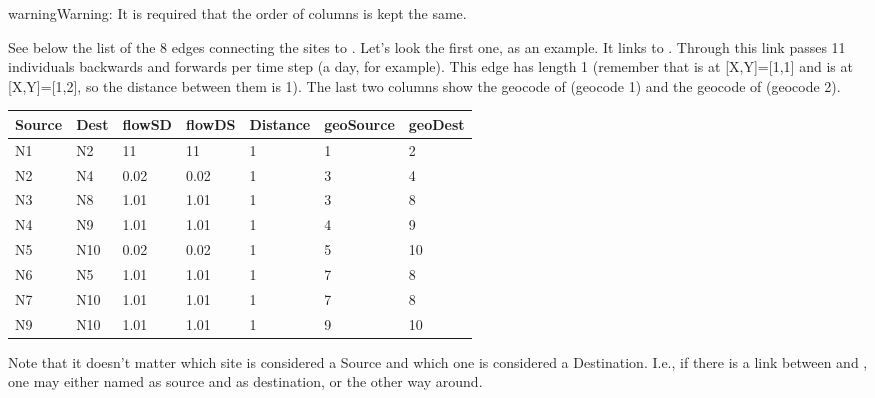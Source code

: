 \documentclass[letterpaper,10pt,english]{sphinxmanual}
\begin{document}
\begin{sphinxadmonition}{warning}{Warning:}
It is required that the order of columns is kept the same.
\end{sphinxadmonition}

See below the list of the 8 edges connecting the sites  to . Let’s look the first one, as an example. It links  to . Through this link passes 11 individuals backwards and forwards per time step (a day, for example). This edge has length 1 (remember that  is at {[}X,Y{]}={[}1,1{]} and  is at {[}X,Y{]}={[}1,2{]}, so the distance between them is 1). The last two columns show the geocode of  (geocode 1) and the geocode of  (geocode 2).


\begin{savenotes}\sphinxattablestart
\centering
\begin{tabulary}{\linewidth}[t]{|T|T|T|T|T|T|T|}
\hline
\sphinxstyletheadfamily 
Source
&\sphinxstyletheadfamily 
Dest
&\sphinxstyletheadfamily 
flowSD
&\sphinxstyletheadfamily 
flowDS
&\sphinxstyletheadfamily 
Distance
&\sphinxstyletheadfamily 
geoSource
&\sphinxstyletheadfamily 
geoDest
\\
\hline
N1
&
N2
&
11
&
11
&
1
&
1
&
2
\\
\hline
N2
&
N4
&
0.02
&
0.02
&
1
&
3
&
4
\\
\hline
N3
&
N8
&
1.01
&
1.01
&
1
&
3
&
8
\\
\hline
N4
&
N9
&
1.01
&
1.01
&
1
&
4
&
9
\\
\hline
N5
&
N10
&
0.02
&
0.02
&
1
&
5
&
10
\\
\hline
N6
&
N5
&
1.01
&
1.01
&
1
&
7
&
8
\\
\hline
N7
&
N10
&
1.01
&
1.01
&
1
&
7
&
8
\\
\hline
N9
&
N10
&
1.01
&
1.01
&
1
&
9
&
10
\\
\hline
\end{tabulary}
\par
\sphinxattableend\end{savenotes}

Note that it doesn’t matter which site is considered a Source and which one is considered a Destination. I.e., if there is a link between  and , one may either named  as source and  as destination, or the other way around.
\end{document}
